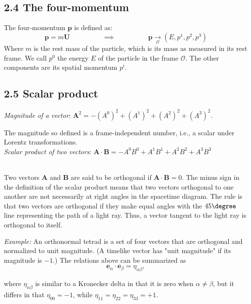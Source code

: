 \documentclass[12pt]{book}
\begin{document}
    \subsection{2.4 The four-momentum}
        The four-momentum \(\mathbf{p}\) is defined as:
        \[
            \mathbf{p} = m \mathbf{U} \hspace{2cm} \implies \hspace{2cm} \mathbf{p} \underset{\mathcal{O}}{\rightarrow} (E, p^1, p^2, p^3)
        \]
        Where \(m\) is the rest mass of the particle, which is its mass as measured in its rest frame. We call \(p^0\) the energy \(E\) of the particle in the frame \(\mathcal{O}\). The other components are its spatial momentum \(p^i\).
        
    \subsection{2.5 Scalar product}
        
        \textit{Magnitude of a vector}: \(\mathbf{A}^2 = -(A^0)^2 + (A^1)^2 + (A^2)^2 + (A^3)^2\). 
        
        The magnitude so defined is a frame-independent number, i.e., a scalar under Lorentz transformations.\\ 
        
         \textit{Scalar product of two vectors}: \(\mathbf{A} \cdot \mathbf{B} = -A^0B^0 + A^1B^1 + A^2B^2 + A^3B^3\)
         
        \\Two vectors \( \mathbf{A} \) and \( \mathbf{B} \) are said to be orthogonal if \( \mathbf{A} \cdot \mathbf{B} = 0 \). The minus sign in the definition of the scalar product means that two vectors orthogonal to one another are not necessarily at right angles in the spacetime diagram. The rule is that two vectors are orthogonal if they make equal angles with the \(45 \degree \) line representing the path of a light ray. Thus, a vector tangent to the light ray is orthogonal to itself.
    
        \textit{Example:} An orthonormal tetrad is a set of four vectors that are orthogonal and normalized to unit magnitude. (A timelike vector has "unit magnitude" if its magnitude is \(-1\).) The relations above can be summarized as
        \[
        \mathbf{e}_\alpha \cdot \mathbf{e}_\beta = \eta_{\alpha\beta},
        \]
        
        where \(\eta_{\alpha\beta}\) is similar to a Kronecker delta in that it is zero when \(\alpha \neq \beta\), but it differs in that \(\eta_{00} = -1\), while \(\eta_{11} = \eta_{22} = \eta_{33} = +1\).
    
\end{document}
